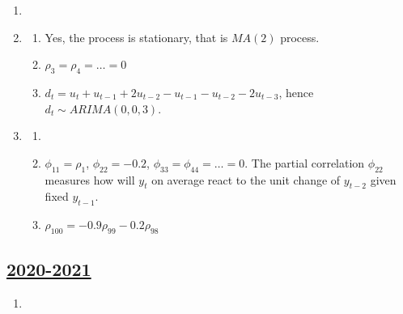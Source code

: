 \begin{enumerate}

\item 

\item 
\begin{enumerate}
    \item Yes, the process is stationary, that is $MA(2)$ process. 
    \item $\rho_3 = \rho_4 = \ldots = 0$
    \item $d_t = u_t + u_{t-1} + 2u_{t-2} - u_{t-1} - u_{t-2} - 2 u_{t-3}$, hence $d_t \sim ARIMA(0, 0, 3)$.
\end{enumerate}

\item 
\begin{enumerate}
    \item 
    \item $\phi_{11} = \rho_1$, $\phi_{22} = -0.2$, $\phi_{33} = \phi_{44} = \ldots = 0$. 
    The partial correlation $\phi_{22}$ measures how will $y_t$ on average react to the unit change of $y_{t-2}$ given fixed $y_{t-1}$.
    \item $\rho_{100} = -0.9 \rho_{99} - 0.2 \rho_{98}$
\end{enumerate}

\end{enumerate}
    

\subsection[2020-2021]{\hyperref[sec:kr_03_2020_2021]{2020-2021}}
\label{sec:sol_kr_03_2020_2021} %



\begin{enumerate}
    
    
    
    \item
 
 
\end{enumerate}


